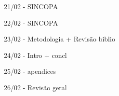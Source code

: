 
21/02  -  SINCOPA


22/02  -  SINCOPA


23/02  -  Metodologia + Revisão biblio


24/02  -  Intro + concl


25/02  -  apendices


26/02  - Revisão geral